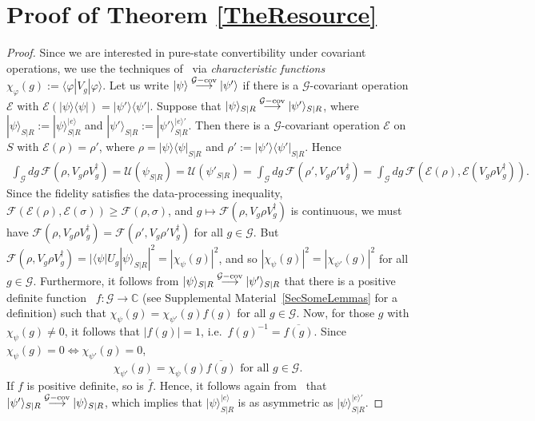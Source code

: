 \documentclass[aps,10pt,twocolumn,showpacs,pra,citeautoscript,amsmath,amssymb,floatfix,superscriptaddress]{revtex4-1}
\begin{document}
\section{Proof of Theorem \ref{TheResource}} \label{app:proof2}
\begin{proof}
Since we are interested in pure-state convertibility under covariant operations, we use the techniques of~\cite{Marvian,MarvianSpekkens} via \emph{characteristic functions} $\chi_{\varphi}(g):=\langle\varphi|V_g|\varphi\rangle$. Let us write $|\psi\rangle\stackrel{\mathcal{G}-{\rm cov}}\longrightarrow |\psi'\rangle$ if there is a $\mathcal{G}$-covariant operation $\mathcal{E}$ with $\mathcal{E}(|\psi\rangle\langle\psi|)=|\psi'\rangle\langle\psi'|$. Suppose that $|\psi\rangle_{S|R}\stackrel{\mathcal{G}-{\rm cov}}\longrightarrow |\psi'\rangle_{S|R}$, where $|\psi\rangle_{S|R}:=|\psi\rangle_{S|R}^{|e\rangle}$ and $|\psi'\rangle_{S|R}:=|\psi'\rangle_{S|R}^{|e\rangle'}$. Then there is a $\mathcal{G}$-covariant operation $\mathcal{E}$ on $S$ with $\mathcal{E}(\rho)=\rho'$, where $\rho=|\psi\rangle\langle\psi|_{S|R}$ and $\rho':=|\psi'\rangle\langle\psi'|_{S|R}$. Hence
\begin{eqnarray*}
\int_{\mathcal{G}}dg\,\mathcal{F}(\rho,V_g\rho V_g^\dagger)=\mathcal{U}(\psi_{S|R})=\mathcal{U}(\psi'_{S|R})
= \int_{\mathcal{G}}dg\, \mathcal{F}(\rho',V_g \rho' V_g^\dagger)=\int_{\mathcal{G}}dg\, \mathcal{F}(\mathcal{E}(\rho),\mathcal{E}(V_g\rho V_g^\dagger)).
\end{eqnarray*}
Since the fidelity satisfies the data-processing inequality, $\mathcal{F}(\mathcal{E}(\rho),\mathcal{E}(\sigma))\geq\mathcal{F}(\rho,\sigma)$, and $g\mapsto \mathcal{F}(\rho,V_g\rho V_g^\dagger)$ is continuous, we must have $\mathcal{F}(\rho,V_g\rho V_g^\dagger)=\mathcal{F}(\rho',V_g\rho'V_g^\dagger)$ for all $g\in\mathcal{G}$. But $\mathcal{F}(\rho,V_g\rho V_g^\dagger)=|\langle\psi|U_g|\psi\rangle_{S|R}|^2=|\chi_{\psi}(g)|^2$, and so $|\chi_{\psi}(g)|^2=|\chi_{\psi'}(g)|^2$ for all $g\in\mathcal{G}$. Furthermore, it follows from $|\psi\rangle_{S|R}\stackrel{\mathcal{G}-{\rm cov}}\longrightarrow |\psi'\rangle_{S|R}$ that there is a positive definite function~\cite[Theorem 63]{Marvian} $f:\mathcal{G}\to\mathbb{C}$ (see Supplemental Material~\ref{SecSomeLemmas} for a definition) such that $\chi_{\psi}(g)=\chi_{\psi'}(g)f(g)$ for all $g\in\mathcal{G}$. Now, for those $g$ with $\chi_{\psi}(g)\neq 0$, it follows that $|f(g)|=1$, i.e.\ $f(g)^{-1}=\overline{f(g)}$. Since $\chi_{\psi}(g)=0\Leftrightarrow \chi_{\psi'}(g)=0$,
\[
   \chi_{\psi'}(g)=\chi_{\psi}(g) \overline{f(g)}\mbox{ for all }g\in\mathcal{G}.
\]
If $f$ is positive definite, so is $\bar f$. Hence, it follows again from~\cite[Theorem 63]{Marvian} that $|\psi'\rangle_{S|R}\stackrel{\mathcal{G}-{\rm cov}}\longrightarrow |\psi\rangle_{S|R}$, which implies that $|\psi\rangle_{S|R}^{|e\rangle}$ is as asymmetric as $|\psi\rangle_{S|R}^{|e\rangle'}$.
\end{proof}
\end{document}
